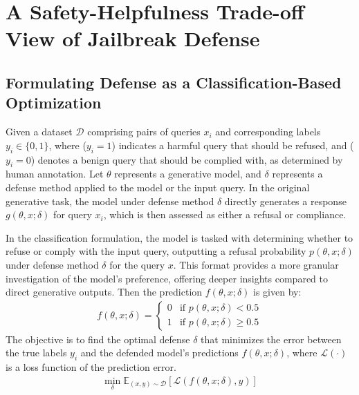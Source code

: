 \section{A Safety-Helpfulness Trade-off View of Jailbreak Defense}
\label{sec:trade_off_analysis}

\subsection{Formulating Defense as a Classification-Based Optimization}
Given a dataset \(\mathcal{D}\) comprising pairs of queries \(x_i\) and corresponding labels \(y_i \in \{0, 1\}\), where (\(y_i = 1\)) indicates a harmful query that should be refused, and (\(y_i = 0\)) denotes a benign query that should be complied with, as determined by human annotation. Let \(\theta\) represents a generative model, and \(\delta\) represents a defense method applied to the model or the input query. In the original generative task, the model under defense method \( \delta \) directly generates a response \(g(\theta, x; \delta)\) for query \(x_i\), which is then assessed as either a refusal or compliance.

In the classification formulation, the model is tasked with determining whether to refuse or comply with the input query, outputting a refusal probability \(p(\theta, x; \delta)\) under defense method \( \delta \) for the query \( x \). This format provides a more granular investigation of the model's preference, offering deeper insights compared to direct generative outputs.
Then the prediction \(f(\theta, x; \delta)\) is given by:
\begin{align*}
    f(\theta, x; \delta) = 
    \left\{
    \begin{array}{ll}
    0 & \text{if } p(\theta, x; \delta) < 0.5 \\
    1 & \text{if } p(\theta, x; \delta) \geq 0.5
    \end{array}
\right.
\end{align*}
The objective is to find the optimal defense \( \delta \) that minimizes the error between the true labels \(y_i\) and the defended model's predictions \(f(\theta, x; \delta)\), where \(\mathcal{L}(\cdot)\) is a loss function of the prediction error.
\begin{align*}
\min_{\delta} \mathbb{E}_{(x, y) \sim \mathcal{D}} \left[ \mathcal{L}(f(\theta, x; \delta), y) \right]
\end{align*}

